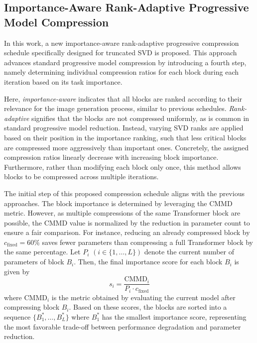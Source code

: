 \subsection{Importance-Aware Rank-Adaptive Progressive Model Compression}
\label{sec:LinearProgressiveCompression}
In this work, a new importance-aware rank-adaptive progressive compression schedule specifically designed for truncated \gls{SVD} is proposed. This approach advances standard progressive model compression by introducing a fourth step, namely determining individual compression ratios for each block during each iteration based on its task importance. 

Here, \textit{importance-aware} indicates that all blocks are ranked according to their relevance for the image generation process, similar to previous schedules. \textit{Rank-adaptive} signifies that the blocks are not compressed uniformly, as is common in standard progressive model reduction. Instead, varying \gls{SVD} ranks are applied based on their position in the importance ranking, such that less critical blocks are compressed more aggressively than important ones. Concretely, the assigned compression ratios linearly decrease with increasing block importance. Furthermore, rather than modifying each block only once, this method allows blocks to be compressed across multiple iterations. 

 The initial step of this proposed compression schedule aligns with the previous approaches. The block importance is determined by leveraging the \gls{CMMD} metric. However, as multiple compressions of the same Transformer block are possible, the \gls{CMMD} value is normalized by the reduction in parameter count to ensure a fair comparison. For instance, reducing an already compressed block by $c_\text{fixed} = 60\%$ saves fewer parameters than compressing a full Transformer block by the same percentage. Let $P_i$ $(i \in \{1, \dots, L\})$ denote the current number of parameters of block $B_i$. Then, the final importance score for each block $B_i$ is given by 
 \begin{equation}
 	s_i = \frac{\text{CMMD}_i}{P_i \cdot c_\text{fixed}}
 \end{equation}
where $\text{CMMD}_i$ is the metric obtained by evaluating the current model after compressing block $B_i$. Based on these scores, the blocks are sorted into a sequence $\{B^*_1, \dots, B^*_L\}$ where $B_1^*$ has the smallest importance score, representing the most favorable trade-off between performance degradation and parameter reduction.

